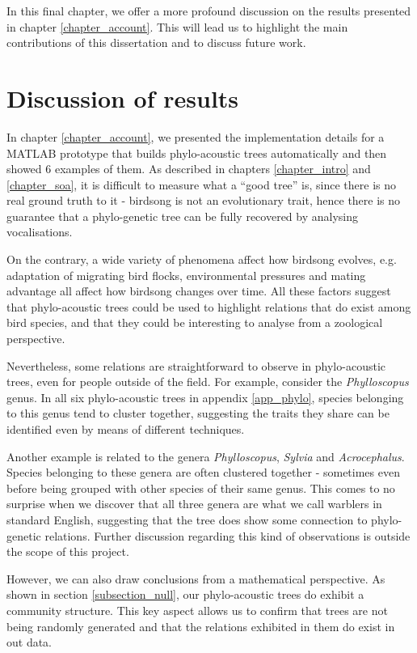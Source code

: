 \documentclass[../main.tex]{subfiles}
\begin{document}
 \label{chapter_conclusion}
In this final chapter, we offer a more profound discussion on the results presented in chapter \ref{chapter_account}. This will lead us to highlight the main contributions of this dissertation and to discuss future work.

\section{Discussion of results}
In chapter \ref{chapter_account}, we presented the implementation details for a MATLAB prototype that builds phylo-acoustic trees automatically and then showed 6 examples of them. As described in chapters \ref{chapter_intro} and \ref{chapter_soa}, it is difficult to measure what a ``good tree'' is, since there is no real ground truth to it - birdsong is not an evolutionary trait, hence there is no guarantee that a phylo-genetic tree can be fully recovered by analysing vocalisations. 
\par On the contrary, a wide variety of phenomena affect how birdsong evolves, e.g. adaptation of migrating bird flocks, environmental pressures and mating advantage all affect how birdsong changes over time. All these factors suggest that phylo-acoustic trees could be used to highlight relations that do exist among bird species, and that they could be interesting to analyse from a zoological perspective.
\par Nevertheless, some relations are straightforward to observe in phylo-acoustic trees, even for people outside of the field. For example, consider the \emph{Phylloscopus} genus. In all six phylo-acoustic trees in appendix \ref{app_phylo}, species belonging to this genus tend to cluster together, suggesting the traits they share can be identified even by means of different techniques.
\par Another example is related to the genera \emph{Phylloscopus}, \emph{Sylvia} and \emph{Acrocephalus}. Species belonging to these genera are often clustered together - sometimes even before being grouped with other species of their same genus. This comes to no surprise when we discover that all three genera are what we call warblers in standard English, suggesting that the tree does show some connection to phylo-genetic relations. Further discussion regarding this kind of observations is outside the scope of this project.
\par However, we can also draw conclusions from a mathematical perspective. As shown in section \ref{subsection_null}, our phylo-acoustic trees do exhibit a community structure. This key aspect allows us to confirm that trees are not being randomly generated and that the relations exhibited in them do exist in out data. 
\end{document}
